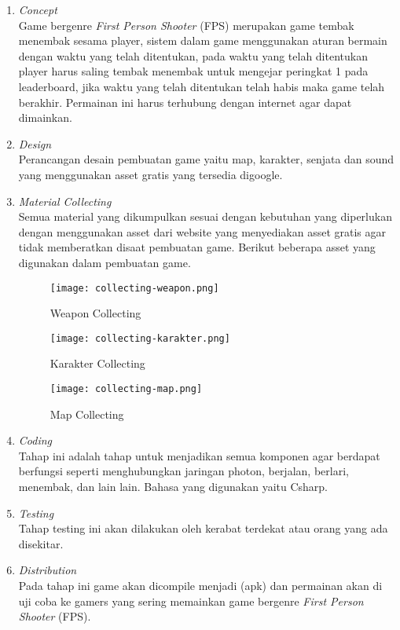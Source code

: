 \begin{enumerate}
    \item \textit{Concept} \\
    Game bergenre \textit{First Person Shooter} (FPS) merupakan game tembak menembak sesama player, sistem dalam game menggunakan aturan bermain dengan waktu yang telah ditentukan, pada waktu yang telah ditentukan player harus saling tembak menembak untuk mengejar peringkat 1 pada leaderboard, jika waktu yang telah ditentukan telah habis maka game telah berakhir. Permainan ini harus terhubung dengan internet agar dapat dimainkan.
    \item \textit{Design} \\
    Perancangan desain pembuatan game yaitu map, karakter, senjata dan sound yang menggunakan asset gratis yang tersedia digoogle.
    \item \textit{Material Collecting} \\
    Semua material yang dikumpulkan sesuai dengan kebutuhan yang diperlukan dengan menggunakan asset dari website yang menyediakan asset gratis agar tidak memberatkan disaat pembuatan game. Berikut beberapa asset yang digunakan dalam pembuatan game.
    \begin{figure}[h]
        \centering
        \texttt{[image: collecting-weapon.png]}
        \caption{Weapon Collecting}
        \label{fig:weapon-collecting}
    \end{figure}
    \begin{figure}[h]
        \centering
        \texttt{[image: collecting-karakter.png]}
        \caption{Karakter Collecting}
        \label{fig:karakter-collecting}
    \end{figure}
    \begin{figure}[h]
        \centering
        \texttt{[image: collecting-map.png]}
        \caption{Map Collecting}
        \label{fig:map-collecting}
    \end{figure}
    \newpage
    \item \textit{Coding} \\
    Tahap ini adalah tahap untuk menjadikan semua komponen agar berdapat berfungsi seperti menghubungkan jaringan photon, berjalan, berlari, menembak, dan lain lain. Bahasa yang digunakan yaitu Csharp.
    \item \textit{Testing} \\
    Tahap testing ini akan dilakukan oleh kerabat terdekat atau orang yang ada disekitar.
    \item \textit{Distribution} \\
    Pada tahap ini game akan dicompile menjadi (apk) dan permainan akan di uji coba ke gamers yang sering memainkan game bergenre \textit{First Person Shooter} (FPS).
\end{enumerate}

